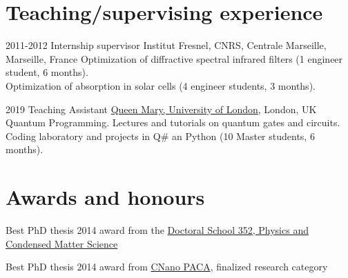 \documentclass{cv}
\begin{document}

\vspace*{-0.2cm}
\section{Teaching/supervising experience}

\begin{entrylist}
	\entry
	{2011-2012}
	{Internship supervisor}
	{{Institut Fresnel}, CNRS, Centrale Marseille, Marseille, France}
	{Optimization of diffractive spectral infrared filters (1 engineer student, 6 months).\\
		Optimization of absorption in solar cells (4 engineer students, 3 months).
	}

	\entry
	{2019}
	{Teaching Assistant}
	{\href{http://antennas.eecs.qmul.ac.uk/}{Queen Mary, University of London}, London, UK}
	{Quantum Programming. Lectures and tutorials on quantum gates and circuits.
		Coding laboratory and projects in Q\# an Python (10 Master students, 6 months).}


\end{entrylist}

\vspace*{-0.2cm}
\section{Awards and honours}

  {Best PhD thesis 2014 award} from the {\href{https://ecole-doctorale-352.univ-amu.fr/en}{Doctoral School 352, Physics and Condensed Matter Science}}

  {Best PhD thesis 2014 award from {\href{https://www.cnano-paca.fr/index.php?option=com_content&view=article&id=80}{CNano PACA}}, finalized research category}






\end{document}
